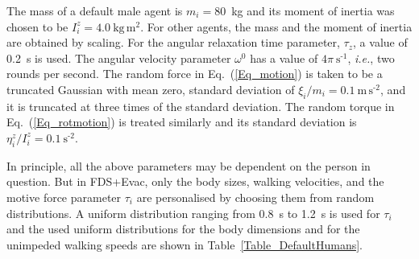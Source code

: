 \documentclass[12pt,a4paper,final,twoside]{stylevk}
\begin{document}
The mass of a default male agent is $m_i = 80$~kg and its moment of
inertia was chosen to be $I^z_{i} = 4.0 ~\mathrm{ \textrm{kg} \,
  \textrm{m}^\textrm{2} }$.  For other agents, the mass and the moment
of inertia are obtained by scaling.  For the angular relaxation time
parameter, $\tau_z$, a value of 0.2~s is used.  The angular velocity
parameter $\omega^0$ has a value of $4\pi~\mathrm{
  \textrm{s}^\textrm{-1} } $, \emph{i.e.}, two rounds per second.  The
random force in Eq.~(\ref{Eq_motion}) is taken to be a truncated
Gaussian with mean zero, standard deviation of $ {\xi}_i/m_i = 0.1
~\mathrm{ \textrm{m} \, \textrm{s}^\textrm{-2}}$, and it is truncated
at three times of the standard deviation.  The random torque in
Eq.~(\ref{Eq_rotmotion}) is treated similarly and its standard deviation
is $ {\eta}^z_{i}/ I^z_{i} = 0.1 ~\mathrm{ \textrm{s}^\textrm{-2}}$.


In principle, all the above parameters may be dependent on the person
in question.  But in FDS+Evac, only the body sizes, walking
velocities, and the motive force parameter $\tau_i$ are personalised
by choosing them from random distributions.  A uniform distribution
ranging from 0.8~s to 1.2~s is used for $\tau_i$ and the used uniform
distributions for the body dimensions and for the unimpeded walking
speeds are shown in Table~\ref{Table_DefaultHumans}.
\end{document}
